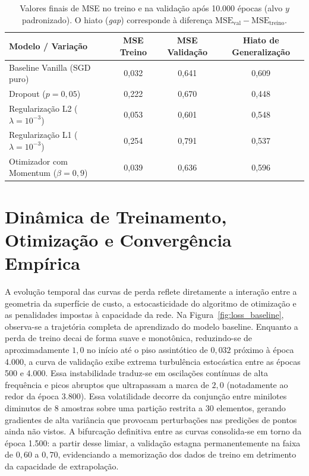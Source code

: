 \documentclass[11pt,a4paper]{article}
\begin{document}
\begin{table}[htbp]
\centering
\small
\renewcommand{\arraystretch}{1.2}
\caption{Valores finais de MSE no treino e na validação após 10.000 épocas (alvo $y$ padronizado). O hiato (\textit{gap}) corresponde à diferença $\mathrm{MSE}_{\mathrm{val}} - \mathrm{MSE}_{\mathrm{treino}}$.}
\label{tab:train_val}
\begin{tabular}{l c c c}
\toprule
\textbf{Modelo / Variação} & \textbf{MSE Treino} & \textbf{MSE Validação} & \textbf{Hiato de Generalização} \\
\midrule
Baseline Vanilla (SGD puro) & 0{,}032 & 0{,}641 & 0{,}609 \\
Dropout ($p=0{,}05$) & 0{,}222 & 0{,}670 & 0{,}448 \\
Regularização L2 ($\lambda=10^{-3}$) & 0{,}053 & 0{,}601 & 0{,}548 \\
Regularização L1 ($\lambda=10^{-3}$) & 0{,}254 & 0{,}791 & 0{,}537 \\
Otimizador com Momentum ($\beta=0{,}9$) & 0{,}039 & 0{,}636 & 0{,}596 \\
\bottomrule
\end{tabular}
\end{table}

\section{Dinâmica de Treinamento, Otimização e Convergência Empírica}

A evolução temporal das curvas de perda reflete diretamente a interação entre a geometria da superfície de custo, a estocasticidade do algoritmo de otimização e as penalidades impostas à capacidade da rede. Na Figura~\ref{fig:loss_baseline}, observa-se a trajetória completa de aprendizado do modelo baseline. Enquanto a perda de treino decai de forma suave e monotônica, reduzindo-se de aproximadamente $1{,}0$ no início até o piso assintótico de $0{,}032$ próximo à época 4.000, a curva de validação exibe extrema turbulência estocástica entre as épocas 500 e 4.000. Essa instabilidade traduz-se em oscilações contínuas de alta frequência e picos abruptos que ultrapassam a marca de $2{,}0$ (notadamente ao redor da época 3.800). Essa volatilidade decorre da conjunção entre minilotes diminutos de 8 amostras sobre uma partição restrita a 30 elementos, gerando gradientes de alta variância que provocam perturbações nas predições de pontos ainda não vistos. A bifurcação definitiva entre as curvas consolida-se em torno da época 1.500: a partir desse limiar, a validação estagna permanentemente na faixa de $0{,}60$ a $0{,}70$, evidenciando a memorização dos dados de treino em detrimento da capacidade de extrapolação.
\end{document}
